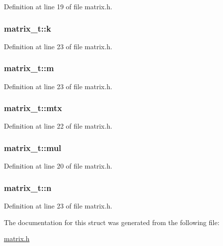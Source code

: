 Definition at line 19 of file matrix.\-h.

\hypertarget{structmatrix__t_a6e90ff9b85753d86727ee29c541d0ef2}{
\subsubsection[{k}]{ matrix\-\_\-t\-::k}}\label{structmatrix__t_a6e90ff9b85753d86727ee29c541d0ef2}


Definition at line 23 of file matrix.\-h.

\hypertarget{structmatrix__t_a19674d4d094d4f933ac48186efb0090f}{
\subsubsection[{m}]{ matrix\-\_\-t\-::m}}\label{structmatrix__t_a19674d4d094d4f933ac48186efb0090f}


Definition at line 23 of file matrix.\-h.

\hypertarget{structmatrix__t_ad4b17c5b56fb149bad1f3339468eb458}{
\subsubsection[{mtx}]{ matrix\-\_\-t\-::mtx}}\label{structmatrix__t_ad4b17c5b56fb149bad1f3339468eb458}


Definition at line 22 of file matrix.\-h.

\hypertarget{structmatrix__t_ab09e33ae0e047cb88a7e52120a4cf730}{
\subsubsection[{mul}]{ matrix\-\_\-t\-::mul}}\label{structmatrix__t_ab09e33ae0e047cb88a7e52120a4cf730}


Definition at line 20 of file matrix.\-h.

\hypertarget{structmatrix__t_a53ef69c811fd2c3065c1d4be804bceae}{
\subsubsection[{n}]{ matrix\-\_\-t\-::n}}\label{structmatrix__t_a53ef69c811fd2c3065c1d4be804bceae}


Definition at line 23 of file matrix.\-h.



The documentation for this struct was generated from the following file\-:\begin{DoxyCompactItemize}
\item 
\hyperlink{matrix_8h}{matrix.\-h}\end{DoxyCompactItemize}
